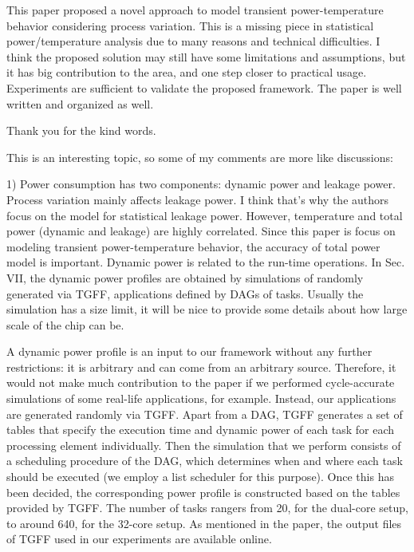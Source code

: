 \begin{reviewer}
This paper proposed a novel approach to model transient power-temperature behavior considering process variation. This is a missing piece in statistical power/temperature analysis due to many reasons and technical difficulties. I think the proposed solution may still have some limitations and assumptions, but it has big contribution to the area, and one step closer to practical usage. Experiments are sufficient to validate the proposed framework. The paper is well written and organized as well.
\end{reviewer}
\begin{authors}
Thank you for the kind words.
\end{authors}

\begin{reviewer}
This is an interesting topic, so some of my comments are more like discussions:

1) Power consumption has two components: dynamic power and leakage power. Process variation mainly affects leakage power. I think that’s why the authors focus on the model for statistical leakage power. However, temperature and total power (dynamic and leakage) are highly correlated. Since this paper is focus on modeling transient power-temperature behavior, the accuracy of total power model is important. Dynamic power is related to the run-time operations. In Sec. VII, the dynamic power profiles are obtained by simulations of randomly generated via TGFF, applications defined by DAGs of tasks. Usually the simulation has a size limit, it will be nice to provide some details about how large scale of the chip can be.
\end{reviewer}
\begin{authors}
A dynamic power profile is an input to our framework without any further restrictions: it is arbitrary and can come from an arbitrary source.
Therefore, it would not make much contribution to the paper if we performed cycle-accurate simulations of some real-life applications, for example.
Instead, our applications are generated randomly via TGFF.
Apart from a DAG, TGFF generates a set of tables that specify the execution time and dynamic power of each task for each processing element individually.
Then the simulation that we perform consists of a scheduling procedure of the DAG, which determines when and where each task should be executed (we employ a list scheduler for this purpose).
Once this has been decided, the corresponding power profile is constructed based on the tables provided by TGFF.
The number of tasks rangers from 20, for the dual-core setup, to around 640, for the 32-core setup.
As mentioned in the paper, the output files of TGFF used in our experiments are available online.
\end{authors}

